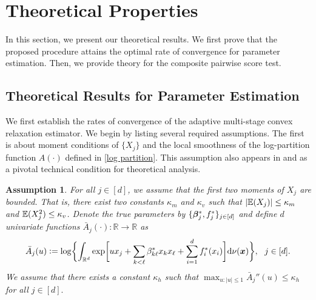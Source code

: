 \documentclass[twoside,11pt]{article}
\newtheorem{assumption}[theorem]{Assumption}
\newcommand{\defeq}{\vcentcolon=}
\newcommand*{\BR}{\mathbb{R}}
\begin{document}
\section{Theoretical Properties}\label{sec::theory}
In this section, we present our theoretical results.  We first prove that the proposed procedure attains the optimal rate of convergence for parameter estimation. Then, we  provide theory for the composite pairwise score test.

\subsection{Theoretical Results for Parameter Estimation}\label{subsec::TheoryEstimation}
We first establish  the rates of convergence  of the adaptive multi-stage convex relaxation estimator. We begin by listing several required assumptions. The first  is about  moment conditions of $\{X_j\}$ and the  local smoothness of the log-partition function $A(\cdot)$ defined in \eqref{log partition}. This assumption also appears in \cite{yang2013graphical} and  \cite{chen2013selection} as a pivotal technical condition for theoretical analysis.

\begin{assumption}\label{assume::NodeTail}
For all $j \in [d]$, we assume that the first two moments of $X_j$ are bounded. That is, there exist two constants $\kappa_m$ and $\kappa_v$ such that 
$
 | \mathbb{E}( X_j) | \leq \kappa_m$ and $\mathbb{E}(X_j^2) \leq \kappa_v$. 
Denote the true parameters by $ \{ \bm{\beta}_j^*, f_j^* \}_{j\in[d]}$ and  define $d$ univariate functions $\bar{A}_j(\cdot) \colon \BR\rightarrow \BR$ as 
\begin{align*}
\bar {A}_j(u) \defeq \log \biggl\{ \int_{ \BR^d}\exp \biggl [ u x_j + \sum_{k<\ell} \beta_{k\ell}^* x_k x_\ell + \sum\limits_{i=1}^d  f_i^*(x_i)\biggr ] \ud \nu(\bx)\biggr\}, ~~j\in [d].
\end{align*}
We assume that  there exists a constant $\kappa_h$ such that $\max _{u\colon |u|\leq 1} \bar{A}_j''(u)  \leq \kappa_h$ for all $j\in[d].$ 
\end{assumption}
\end{document}
